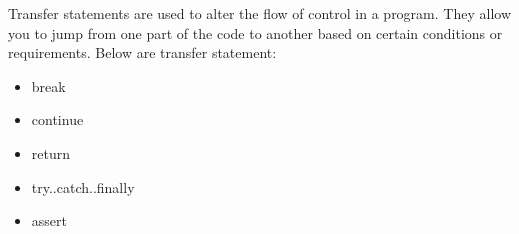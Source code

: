 \setlength{\columnsep}{3pt}
\begin{flushleft}

	Transfer statements are used to alter the flow of control in a program. They allow you to jump from one part of the code to another based on certain conditions or requirements.
	Below are transfer statement:
	\begin{itemize}
		\item break
		\item continue
		\item return
		\item try..catch..finally
		\item assert
	\end{itemize}
	
\end{flushleft}


